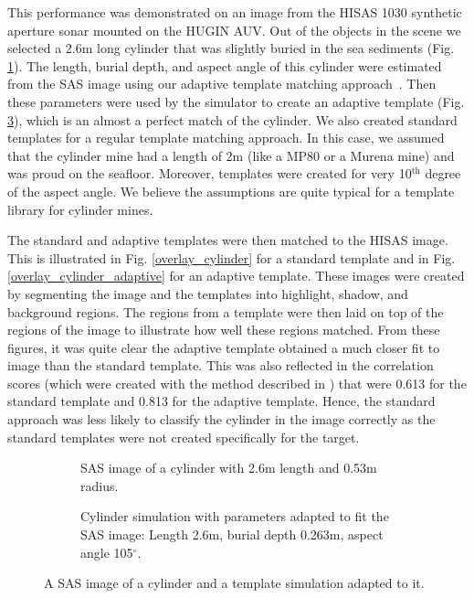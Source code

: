 \documentclass[
   UAM                                          %
 , 12pt                                         %
 , bibtex                                       %
 , layout
]{common/mytemplate}
\begin{document}
This performance was demonstrated on an image from the HISAS 1030 synthetic aperture sonar mounted on the HUGIN AUV. Out of the objects in the scene we selected a 2.6\;m long cylinder that was slightly buried in the sea sediments (Fig. \ref{data_cylinder}). The length, burial depth, and aspect angle of this cylinder were estimated from the SAS image using our  adaptive template matching approach~\cite{Midelfart2010}.  Then these parameters were used by the simulator to create an adaptive template (Fig. \ref{sim_cylinder}), which is an almost a perfect match of the cylinder. We also created standard templates for a regular template matching approach. In this case, we assumed that the cylinder mine had a length of 2\;m (like a MP80 or a Murena mine) and was proud on the seafloor. Moreover, templates were created for very 10$^\text{th}$ degree of the aspect angle. We believe the assumptions are quite typical for a template library for cylinder mines. 

The standard and adaptive templates were then matched to the HISAS image. This is illustrated in Fig. \ref{overlay_cylinder} for a standard template and in Fig. \ref{overlay_cylinder_adaptive} for an adaptive template. These images were created by segmenting the image and the templates into highlight, shadow, and background regions. The regions from a template were then laid on top of the regions of the image to illustrate how well these regions matched. From these figures, it was quite clear the adaptive template obtained a much closer fit to image than the standard template. This was also reflected in the correlation scores (which were created with the method described in \cite{Midelfart2010}) that were 0.613 for the standard template and 0.813 for the adaptive template. Hence, the standard approach was less likely to classify the cylinder in the image correctly as the standard templates were not created specifically for the target.

\setcounter{topnumber}{2}

\begin{figure}[p]\centering%
\begin{subfigure}[t]{.5\linewidth-\imgspacing/2}
%
\caption{SAS image of a cylinder with 2.6\;m length and 0.53\;m radius.}\label{data_cylinder}%
\end{subfigure}
\begin{subfigure}[t]{.5\linewidth-\imgspacing/2}
%
\caption{Cylinder simulation with parameters adapted to fit the SAS image: Length 2.6\;m, burial depth 0.263\;m, aspect angle 105$^\circ$.}\label{sim_cylinder}%
\end{subfigure}
\caption{A SAS image of a cylinder and a template simulation adapted to it.}
\end{figure}
\end{document}
